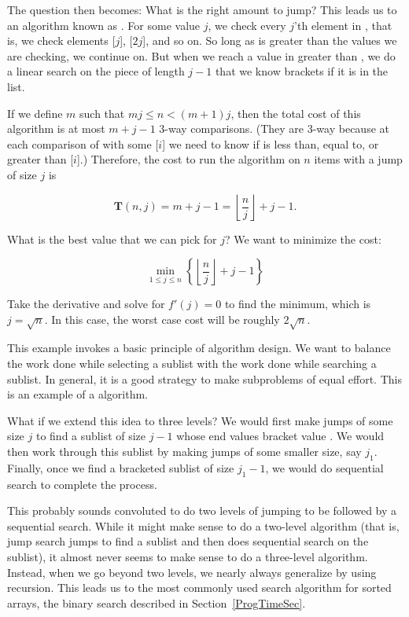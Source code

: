 The question then becomes: What is the right amount to jump?
This leads us to an algorithm known as .
For some value \(j\), we check every \(j\)'th element in ,
that is, we check elements [\(j\)], [\(2j\)], and so on.
So long as  is greater than the values we are checking, we
continue on.
But when we reach a value in  greater than , we do a
linear search on the piece of length \(j-1\) that we know brackets
 if it is in the list.

If we define \(m\) such that \(mj \leq n < (m+1)j\), then the total
cost of this algorithm is at most \(m + j - 1\) 3-way comparisons.
(They are 3-way because at each comparison of  with some
[\(i\)] we need to know if  is less than, equal to, or
greater than [\(i\)].)
Therefore, the cost to run the algorithm on \(n\) items with a jump of
size \(j\) is

\[\textbf{T}(n, j) = m + j - 1 =
\left\lfloor \frac{n}{j} \right\rfloor + j - 1.\]

What is the best value that we can pick for \(j\)?
We want to minimize the cost:

\[\min_{1 \leq j \leq n} \left\{\left\lfloor\frac{n}{j}\right\rfloor +
j - 1\right\}\]

Take the derivative and solve for \(f'(j) = 0\) to find the minimum,
which is \(j = \sqrt{n}\).
In this case, the worst case cost will be
roughly $2\sqrt{n}$.

This example invokes a basic principle of algorithm design.
We want to balance the work done while selecting a sublist with the
work done while searching a sublist.
In general, it is a good strategy to make subproblems of equal effort.
This is an example of a
 algorithm.

What if we extend this idea to three levels?
We would first make jumps of some size \(j\) to find a sublist of size
\(j-1\) whose end values bracket value .
We would then work through this sublist by making jumps of some
smaller size, say \(j_1\).
Finally, once we find a bracketed sublist of size \(j_1 - 1\), we
would do sequential search to complete the process.

This probably sounds convoluted to do two levels of jumping to be
followed by a sequential search.
While it might make sense to do a two-level algorithm (that is, jump
search jumps to find a sublist and then does sequential search on the
sublist),
it almost never seems to make sense to do a three-level algorithm.
Instead, when we go beyond two levels, we nearly always generalize by
using recursion.
This leads us to the most commonly used search algorithm for sorted
arrays, the binary search described in
Section~\ref{ProgTimeSec}.

